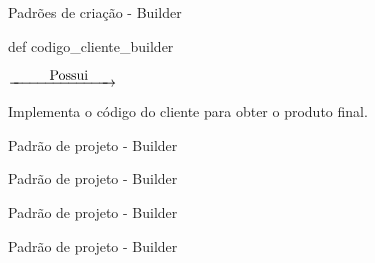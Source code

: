 \begin{frame}[t]{Padrões de criação - Builder}
\begin{minipage}{6cm}
\begin{block}{}
		\end{block}
	\end{minipage}
	\vfill
	\begin{minipage}{4cm}
		\begin{block}{}
			def codigo\_cliente\_builder
		\end{block}
	\end{minipage} 
	$\underrightarrow{\makebox[2cm][r]{Possui}\hspace{2em}}$
	\begin{minipage}{6cm}
		\begin{block}{}
			Implementa o código do cliente para obter o produto final.
		\end{block}
	\end{minipage}
\end{frame}





\begin{frame}[t]{Padrão de projeto - Builder}

	

\end{frame}

\begin{frame}[t]{Padrão de projeto - Builder}

	
	
\end{frame}



\begin{frame}[t]{Padrão de projeto - Builder}

	

\end{frame}


\begin{frame}[t]{Padrão de projeto - Builder}
	
	
	
\end{frame}


